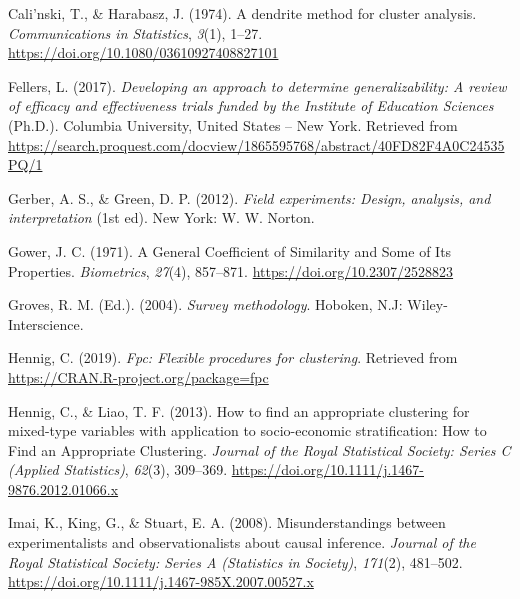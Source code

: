 \documentclass[english,man,floatsintext]{apa6}
\begin{document}
\begingroup
\setlength{\parindent}{-0.5in}
\setlength{\leftskip}{0.5in}

\hypertarget{refs}{}
\leavevmode\hypertarget{ref-calinskiDendriteMethodCluster1974}{}%
Cali\a'nski, T., \& Harabasz, J. (1974). A dendrite method for cluster analysis. \emph{Communications in Statistics}, \emph{3}(1), 1--27. \url{https://doi.org/10.1080/03610927408827101}

\leavevmode\hypertarget{ref-fellersDevelopingApproachDetermine2017}{}%
Fellers, L. (2017). \emph{Developing an approach to determine generalizability: A review of efficacy and effectiveness trials funded by the Institute of Education Sciences} (Ph.D.). Columbia University, United States -- New York. Retrieved from \url{https://search.proquest.com/docview/1865595768/abstract/40FD82F4A0C24535PQ/1}

\leavevmode\hypertarget{ref-gerberFieldExperimentsDesign2012}{}%
Gerber, A. S., \& Green, D. P. (2012). \emph{Field experiments: Design, analysis, and interpretation} (1st ed). New York: W. W. Norton.

\leavevmode\hypertarget{ref-gowerGeneralCoefficientSimilarity1971}{}%
Gower, J. C. (1971). A General Coefficient of Similarity and Some of Its Properties. \emph{Biometrics}, \emph{27}(4), 857--871. \url{https://doi.org/10.2307/2528823}

\leavevmode\hypertarget{ref-grovesSurveyMethodology2004}{}%
Groves, R. M. (Ed.). (2004). \emph{Survey methodology}. Hoboken, N.J: Wiley-Interscience.

\leavevmode\hypertarget{ref-R-fpc}{}%
Hennig, C. (2019). \emph{Fpc: Flexible procedures for clustering}. Retrieved from \url{https://CRAN.R-project.org/package=fpc}

\leavevmode\hypertarget{ref-hennigHowFindAppropriate2013}{}%
Hennig, C., \& Liao, T. F. (2013). How to find an appropriate clustering for mixed-type variables with application to socio-economic stratification: How to Find an Appropriate Clustering. \emph{Journal of the Royal Statistical Society: Series C (Applied Statistics)}, \emph{62}(3), 309--369. \url{https://doi.org/10.1111/j.1467-9876.2012.01066.x}

\leavevmode\hypertarget{ref-imaiMisunderstandingsExperimentalistsObservationalists2008}{}%
Imai, K., King, G., \& Stuart, E. A. (2008). Misunderstandings between experimentalists and observationalists about causal inference. \emph{Journal of the Royal Statistical Society: Series A (Statistics in Society)}, \emph{171}(2), 481--502. \url{https://doi.org/10.1111/j.1467-985X.2007.00527.x}
\end{document}

